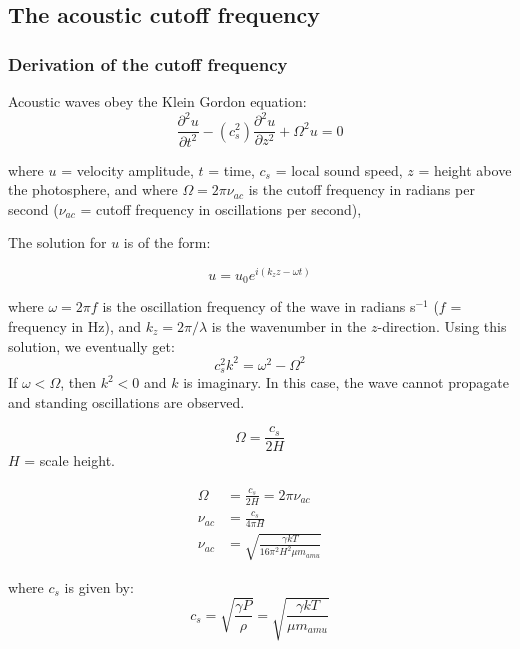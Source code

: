 \subsection{The acoustic cutoff frequency}
\subsubsection{Derivation of the cutoff frequency}

Acoustic waves obey the Klein Gordon equation:
\begin{equation}
    \frac{\partial^{2}u}{\partial t^{2}}
    - \left( c_{s}^{2} \right)
    \frac{\partial^{2}u}{\partial z^{2}}
    + \Omega^{2}u
    = 0
\end{equation}

where
$u$ = velocity amplitude,
$t$ = time,
$c_{s}$ = local sound speed,
$z$ = height above the photosphere, and
where $\Omega = 2\pi\nu_{ac}$
is the cutoff frequency in radians per second
($\nu_{ac}$ = cutoff frequency in oscillations per second),


The solution for $u$ is of the form:

\begin{equation}
    u = u_{0}e^{i\left( k_{z}z - \omega t \right)}
\end{equation}

where $\omega = 2 \pi f$ is the oscillation frequency of the wave
in radians s$^{-1}$ ($f$ = frequency in Hz), and $k_{z} = 2\pi/\lambda$
is the wavenumber in the $z$-direction.
Using this solution, we eventually get:
\begin{equation}
    c_{s}^{2} k^{2} = \omega^{2} - \Omega^{2}
\end{equation}
If $\omega < \Omega$, then $k^{2} < 0$ and $k$ is imaginary.
In this case, the wave cannot propagate and standing oscillations are
observed.

\begin{equation}
    \Omega = \frac{c_{s}}{2H}
\end{equation}
$H$ = scale height.

\begin{align}
    \Omega &= \frac{c_{s}}{2H} = 2\pi\nu_{ac}\\
    \nu_{ac} &= \frac{c_{s}}{4 \pi H}\\
    \nu_{ac} &= \sqrt{ \frac{\gamma k T }{ 16 \pi^{2} H^{2} \mu m_{amu} } }
\end{align}

where $c_{s}$ is given by:
\begin{equation}
    c_{s} = \sqrt{ \frac{ \gamma P }{ \rho }}
    = \sqrt{ \frac{ \gamma k T }{ \mu m_{amu} }}
\end{equation}

